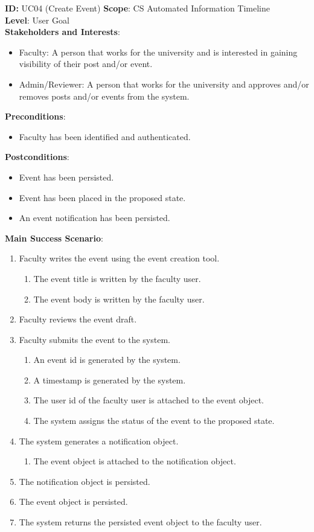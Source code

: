 \textbf{ID:} UC04 (Create Event)
\textbf{Scope}: CS Automated Information Timeline\\
\textbf{Level}: User Goal\\
\textbf{Stakeholders and Interests}:
\begin{itemize}
        \item Faculty: A person that works for the university and is interested in gaining visibility of their post and/or event.
        \item Admin/Reviewer: A person that works for the university and approves and/or removes posts and/or events from the system.
\end{itemize}
\textbf{Preconditions}:
\begin{itemize}
    \item Faculty has been identified and authenticated.
\end{itemize}
\textbf{Postconditions}:
    \begin{itemize}
    \item Event has been persisted.
    \item Event has been placed in the proposed state.
    \item An event notification has been persisted.
\end{itemize}
\textbf{Main Success Scenario}:
\begin{enumerate}
    \item Faculty writes the event using the event creation tool.
    \begin{enumerate}
        \item The event title is written by the faculty user.
        \item The event body is written by the faculty user.
    \end{enumerate}
    \item Faculty reviews the event draft.
    \item Faculty submits the event to the system.
    \begin{enumerate}
        \item An event id is generated by the system.
        \item A timestamp is generated by the system.
        \item The user id of the faculty user is attached to the event object.
        \item The system assigns the status of the event to the proposed state.
    \end{enumerate}
    \item The system generates a notification object.
    \begin{enumerate}
        \item The event object is attached to the notification object.
    \end{enumerate}
    \item The notification object is persisted.
    \item The event object is persisted.
    \item The system returns the persisted event object to the faculty user.
\end{enumerate}
